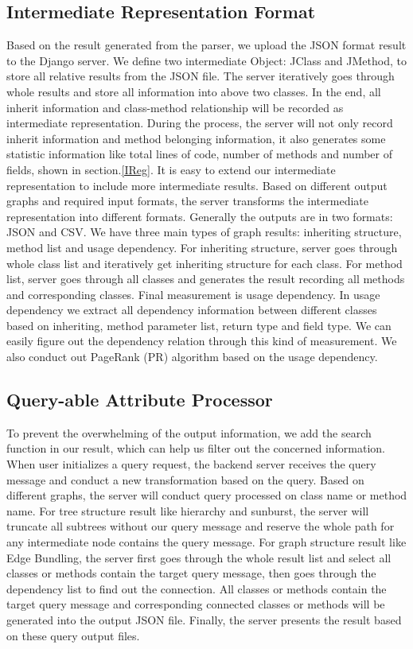 \documentclass{sig-alternate}
\begin{document}
\subsection{Intermediate Representation Format}
Based on the result generated from the parser, we upload the JSON format result to the Django server. We define two intermediate Object: JClass and JMethod, to store all relative results from the JSON file. The server iteratively goes through whole results and store all information into above two classes. In the end, all inherit information and class-method relationship will be recorded as intermediate representation. During the process, the server will not only record inherit information and method belonging information, it also generates some statistic information like total lines of code, number of methods and number of fields, shown in section.\ref{IReg}. It is easy to extend our intermediate representation to include more intermediate results. Based on different output graphs and required input formats, the server transforms the intermediate representation into different formats. Generally the outputs are in two formats: JSON and CSV. We have three main types of graph results: inheriting structure, method list and usage dependency. For inheriting structure, server goes through whole class list and iteratively get inheriting structure for each class. For method list, server goes through all classes and generates the result recording all methods and corresponding classes. Final measurement is usage dependency. In usage dependency we extract all dependency information between different classes based on inheriting, method parameter list, return type and field type. We can easily figure out the dependency relation through this kind of measurement. We also conduct out PageRank (PR) algorithm based on the usage dependency.

\subsection{Query-able Attribute Processor}
To prevent the overwhelming of the output information, we add the search function in our result, which can help us filter out the concerned information. When user initializes a query request, the backend server receives the query message and conduct a new transformation based on the query. Based on different graphs, the server will conduct query processed on class name or method name. For tree structure result like hierarchy and sunburst, the server will truncate all subtrees without our query message and reserve the whole path for any intermediate node contains the query message. For graph structure result like Edge Bundling, the server first goes through the whole result list and select all classes or methods contain the target query message, then goes through the dependency list to find out the connection. All classes or methods contain the target query message and corresponding connected classes or methods will be generated into the output JSON file. Finally, the server presents the result based on these query output files.
\end{document}
